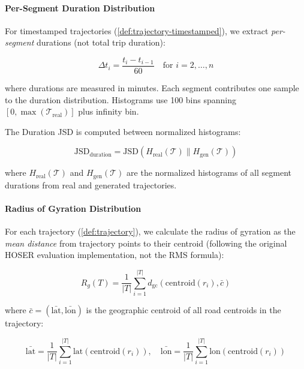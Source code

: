 \paragraph{Per-Segment Duration Distribution}

For timestamped trajectories (\autoref{def:trajectory-timestamped}), we extract \emph{per-segment} durations (not total trip duration):

\begin{equation}
    \Delta t_i = \frac{t_i - t_{i-1}}{60} \quad \text{for } i = 2, \ldots, n
    \label{eq:segment-duration}
\end{equation}

where durations are measured in minutes. Each segment contributes one sample to the duration distribution. Histograms use 100 bins spanning $[0, \max(\mathcal{T}_{\text{real}})]$ plus infinity bin.

The Duration JSD is computed between normalized histograms:

\begin{equation}
    \text{JSD}_{\text{duration}} = \text{JSD}(H_{\text{real}}(\mathcal{T}) \parallel H_{\text{gen}}(\mathcal{T}))
    \label{eq:duration-jsd}
\end{equation}

where $H_{\text{real}}(\mathcal{T})$ and $H_{\text{gen}}(\mathcal{T})$ are the normalized histograms of all segment durations from real and generated trajectories.

\paragraph{Radius of Gyration Distribution}

For each trajectory (\autoref{def:trajectory}), we calculate the radius of gyration as the \emph{mean distance} from trajectory points to their centroid (following the original HOSER evaluation implementation, not the RMS formula):

\begin{equation}
    R_g(T) = \frac{1}{|T|} \sum_{i=1}^{|T|} d_{\text{gc}}(\text{centroid}(r_i), \bar{c})
    \label{eq:radius-gyration}
\end{equation}

where $\bar{c} = (\bar{\text{lat}}, \bar{\text{lon}})$ is the geographic centroid of all road centroids in the trajectory:

\begin{equation}
    \bar{\text{lat}} = \frac{1}{|T|} \sum_{i=1}^{|T|} \text{lat}(\text{centroid}(r_i)), \quad
    \bar{\text{lon}} = \frac{1}{|T|} \sum_{i=1}^{|T|} \text{lon}(\text{centroid}(r_i))
    \label{eq:trajectory-centroid}
\end{equation}

